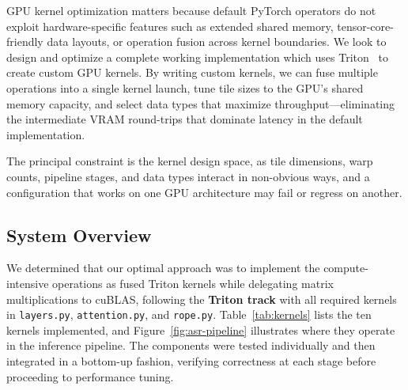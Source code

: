 \documentclass{article}
\begin{document}
GPU kernel optimization matters because default PyTorch operators do not exploit hardware-specific features such as extended shared memory, tensor-core-friendly data layouts, or operation fusion across kernel boundaries.
We look to design and optimize a complete working implementation which uses Triton~\citep{tillet2019triton} to create custom GPU kernels.
By writing custom kernels, we can fuse multiple operations into a single kernel launch, tune tile sizes to the GPU's shared memory capacity, and select data types that maximize throughput---eliminating the intermediate VRAM round-trips that dominate latency in the default implementation.

The principal constraint is the kernel design space, as tile dimensions, warp counts, pipeline stages, and data types interact in non-obvious ways, and a configuration that works on one GPU architecture may fail or regress on another.

\subsection{System Overview}

We determined that our optimal approach was to implement the compute-intensive operations as fused Triton kernels while delegating matrix multiplications to cuBLAS, following the \textbf{Triton track} with all required kernels in \texttt{layers.py}, \texttt{attention.py}, and \texttt{rope.py}.
Table~\ref{tab:kernels} lists the ten kernels implemented, and Figure~\ref{fig:asr-pipeline} illustrates where they operate in the inference pipeline.
The components were tested individually and then integrated in a bottom-up fashion, verifying correctness at each stage before proceeding to performance tuning.
\end{document}
